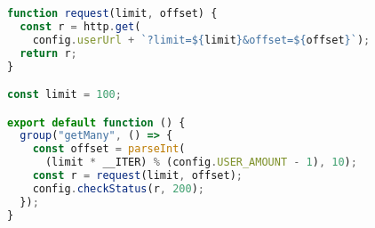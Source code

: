 \begin{lstlisting}[language=JavaScript,caption={K6 GetMany test},breaklines=true,label={lst:k6GetMany}]
function request(limit, offset) {
  const r = http.get(
    config.userUrl + `?limit=${limit}&offset=${offset}`);
  return r;
}

const limit = 100;

export default function () {
  group("getMany", () => {
    const offset = parseInt(
      (limit * __ITER) % (config.USER_AMOUNT - 1), 10);
    const r = request(limit, offset);
    config.checkStatus(r, 200);
  });
}
\end{lstlisting}
